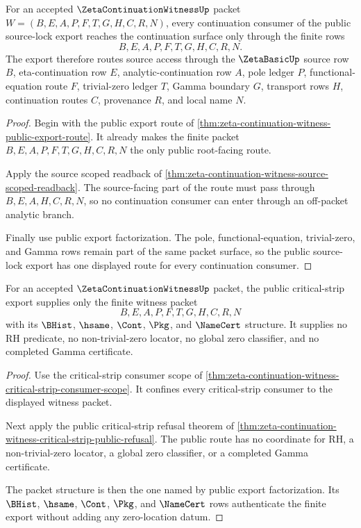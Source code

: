 \begin{theorem}
\label{thm:zeta-continuation-witness-public-source-lock-export}
For an accepted $\ZetaContinuationWitnessUp$ packet $W=(B,E,A,P,F,T,G,H,C,R,N)$, every continuation consumer of the public source-lock export reaches the continuation surface only through the finite rows
$$
B,E,A,P,F,T,G,H,C,R,N.
$$
The export therefore routes source access through the $\ZetaBasicUp$ source row $B$, eta-continuation row $E$, analytic-continuation row $A$, pole ledger $P$, functional-equation route $F$, trivial-zero ledger $T$, Gamma boundary $G$, transport rows $H$, continuation routes $C$, provenance $R$, and local name $N$.
\end{theorem}
\begin{proof}
Begin with the public export route of \autoref{thm:zeta-continuation-witness-public-export-route}. It already makes the finite packet $B,E,A,P,F,T,G,H,C,R,N$ the only public root-facing route.

Apply the source scoped readback of \autoref{thm:zeta-continuation-witness-source-scoped-readback}. The source-facing part of the route must pass through $B,E,A,H,C,R,N$, so no continuation consumer can enter through an off-packet analytic branch.

Finally use public export factorization. The pole, functional-equation, trivial-zero, and Gamma rows remain part of the same packet surface, so the public source-lock export has one displayed route for every continuation consumer.
\end{proof}

\begin{theorem}
\label{thm:zeta-continuation-witness-public-critical-strip-export}
For an accepted $\ZetaContinuationWitnessUp$ packet, the public critical-strip export supplies only the finite witness packet
$$
B,E,A,P,F,T,G,H,C,R,N
$$
with its $\BHist$, $\hsame$, $\Cont$, $\Pkg$, and $\NameCert$ structure. It supplies no RH predicate, no non-trivial-zero locator, no global zero classifier, and no completed Gamma certificate.
\end{theorem}
\begin{proof}
Use the critical-strip consumer scope of \autoref{thm:zeta-continuation-witness-critical-strip-consumer-scope}. It confines every critical-strip consumer to the displayed witness packet.

Next apply the public critical-strip refusal theorem of \autoref{thm:zeta-continuation-witness-critical-strip-public-refusal}. The public route has no coordinate for RH, a non-trivial-zero locator, a global zero classifier, or a completed Gamma certificate.

The packet structure is then the one named by public export factorization. Its $\BHist$, $\hsame$, $\Cont$, $\Pkg$, and $\NameCert$ rows authenticate the finite export without adding any zero-location datum.
\end{proof}

